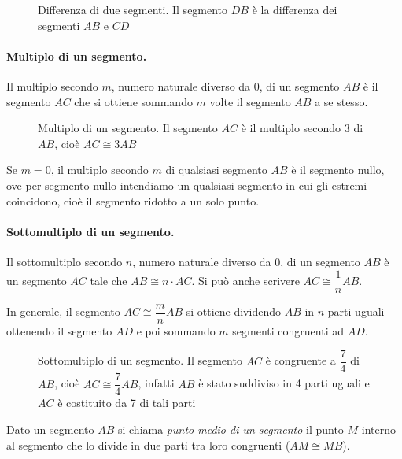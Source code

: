 \begin{figure}[htb]
\centering
\caption{Differenza di due segmenti. Il segmento $DB$ è la differenza dei segmenti $AB$ e $CD$}
\end{figure}

\paragraph{Multiplo di un segmento.} Il multiplo secondo $m$, numero naturale diverso da 0, di un segmento $AB$ è il segmento $AC$ che si ottiene sommando $m$ volte il segmento $AB$ a se stesso.

\begin{figure}[htb]
\centering
\caption{Multiplo di un segmento. Il segmento $AC$ è il multiplo secondo 3 di $AB$, cioè $AC\cong 3AB$}
\end{figure}

Se $m=0$, il multiplo secondo $m$ di qualsiasi segmento $AB$ è il segmento nullo, ove per segmento nullo intendiamo un qualsiasi segmento in cui gli estremi coincidono, cioè il segmento ridotto a un solo punto.

\paragraph{Sottomultiplo di un segmento.} Il sottomultiplo secondo $n$, numero naturale diverso da 0, di un segmento $AB$ è un segmento $AC$ tale che $AB\cong n\cdot AC$. Si può anche scrivere $AC \cong \dfrac{1}{n}AB$.

In generale, il segmento $AC\cong\dfrac{m}{n}AB$ si ottiene dividendo $AB$ in $n$ parti uguali ottenendo il segmento $AD$ e poi sommando $m$ segmenti congruenti ad $AD$.

\begin{figure}[htb]
\centering
\caption{Sottomultiplo di un segmento. Il segmento $AC$ è congruente a $\dfrac{7}{4}$ di $AB$, cioè $AC\cong\dfrac{7}{4}AB$, infatti $AB$ è stato suddiviso in 4 parti uguali e $AC$ è costituito da 7 di tali parti}
\end{figure}

\begin{definizione}
Dato un segmento $AB$ si chiama \emph{punto medio di un segmento} il punto $M$ interno al segmento che lo divide in due parti tra loro congruenti ($AM\cong MB$).
\end{definizione}

